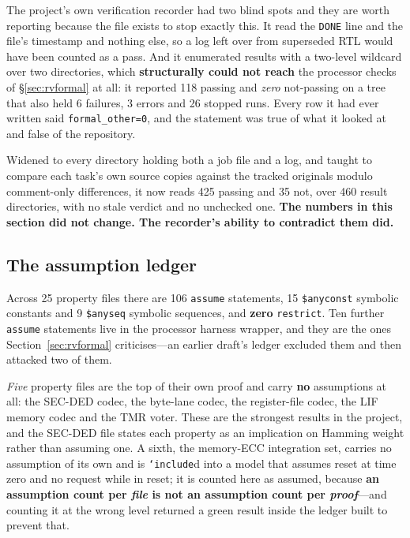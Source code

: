 \documentclass[11pt,a4paper]{article}
\begin{document}
The project's own verification recorder had two blind spots and they are
worth reporting because the file exists to stop exactly this. It read the
\texttt{DONE} line and the file's timestamp and nothing else, so a log
left over from superseded RTL would have been counted as a pass. And it
enumerated results with a two-level wildcard over two directories, which
\textbf{structurally could not reach} the processor checks of
\S\ref{sec:rvformal} at all: it reported \num{118} passing and
\emph{zero} not-passing on a tree that also held 6 failures, 3 errors and
26 stopped runs. Every row it had ever written said
\texttt{formal\_other=0}, and the statement was true of what it looked at
and false of the repository.

Widened to every directory holding both a job file and a log, and taught
to compare each task's own source copies against the tracked originals
modulo comment-only differences, it now reads \num{425} passing and
\num{35} not, over 460 result directories, with no stale verdict and no
unchecked one. \textbf{The numbers in this section did not change. The
recorder's ability to contradict them did.}

\subsection{The assumption ledger}

Across 25 property files there are 106 \texttt{assume} statements, 15
\texttt{\$anyconst} symbolic constants and 9 \texttt{\$anyseq} symbolic
sequences, and \textbf{zero} \texttt{restrict}. Ten further
\texttt{assume} statements live in the processor harness wrapper, and
they are the ones Section~\ref{sec:rvformal} criticises---an earlier
draft's ledger excluded them and then attacked two of them.

\emph{Five} property files are the top of their own proof and carry
\textbf{no} assumptions at all: the SEC-DED codec, the byte-lane codec,
the register-file codec, the LIF memory codec and the TMR voter. These
are the strongest results in the project, and the SEC-DED file states
each property as an implication on Hamming weight rather than assuming
one. A sixth, the memory-ECC integration set, carries no assumption of
its own and is \texttt{`include}d into a model that assumes reset at
time zero and no request while in reset; it is counted here as assumed,
because \textbf{an assumption count per \emph{file} is not an assumption
count per \emph{proof}}---and counting it at the wrong level returned a
green result inside the ledger built to prevent that.
\end{document}
